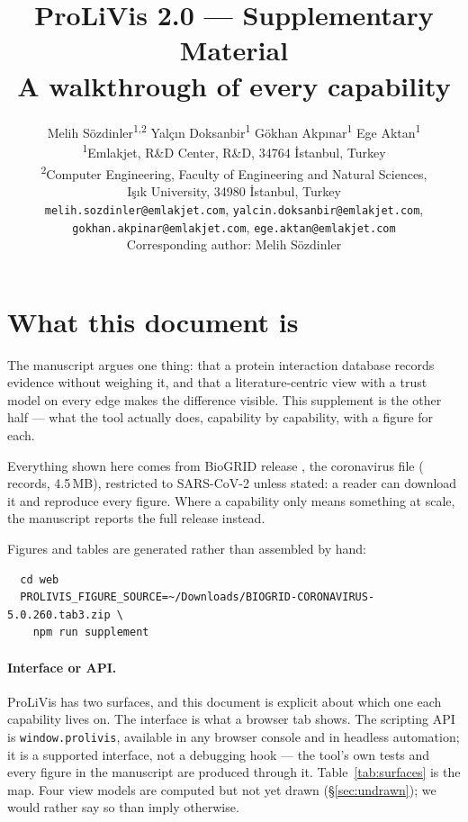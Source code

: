 \documentclass[11pt,a4paper]{article}
\title{ProLiVis 2.0 --- Supplementary Material\\[2pt]
\large A walkthrough of every capability}
\author{%
  Melih Sözdinler\textsuperscript{1,2} \quad
  Yalç\i{}n Doksanbir\textsuperscript{1} \quad
  Gökhan Akp\i{}nar\textsuperscript{1} \quad
  Ege Aktan\textsuperscript{1}\\[6pt]
  {\small\textsuperscript{1}Emlakjet, R\&D Center, R\&D, 34764 \.{I}stanbul, Turkey}\\
  {\small\textsuperscript{2}Computer Engineering, Faculty of Engineering and Natural Sciences,}\\
  {\small I\c{s}\i{}k University, 34980 \.{I}stanbul, Turkey}\\[4pt]
  {\small\texttt{melih.sozdinler@emlakjet.com}, \texttt{yalcin.doksanbir@emlakjet.com},}\\
  {\small\texttt{gokhan.akpinar@emlakjet.com}, \texttt{ege.aktan@emlakjet.com}}\\[2pt]
  {\small Corresponding author: Melih Sözdinler}}
\date{}
\begin{document}
\maketitle

\section{What this document is}

The manuscript argues one thing: that a protein interaction database records evidence
without weighing it, and that a literature-centric view with a trust model on every
edge makes the difference visible. This supplement is the other half --- what the tool
actually does, capability by capability, with a figure for each.

Everything shown here comes from BioGRID release \SuppRelease{}, the coronavirus file
(\SuppRecords{} records, 4.5\,MB), restricted to SARS-CoV-2 unless stated: a reader can
download it and reproduce every figure. Where a capability only means something at
scale, the manuscript reports the full release instead.

Figures and tables are generated rather than assembled by hand:

\begin{verbatim}
  cd web
  PROLIVIS_FIGURE_SOURCE=~/Downloads/BIOGRID-CORONAVIRUS-5.0.260.tab3.zip \
    npm run supplement
\end{verbatim}

\paragraph{Interface or API.} ProLiVis has two surfaces, and this document is explicit
about which one each capability lives on. The interface is what a browser tab shows.
The scripting API is \texttt{window.prolivis}, available in any browser console and in
headless automation; it is a supported interface, not a debugging hook --- the tool's
own tests and every figure in the manuscript are produced through it. Table~\ref{tab:surfaces}
is the map. Four view models are computed but not yet drawn (\S\ref{sec:undrawn}); we
would rather say so than imply otherwise.
\end{document}
